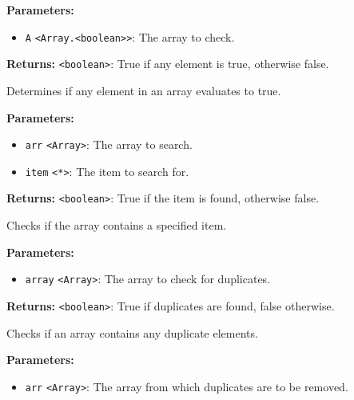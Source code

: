 \documentclass[12pt,a4paper]{article}
\begin{document}
\noindent \textbf{Parameters:}
\begin{itemize}
  \item \texttt{A} \texttt{<Array.<boolean>>}: The array to check.
\end{itemize}

\noindent \textbf{Returns:} \texttt{<boolean>}: True if any element is true, otherwise false.

\noindent Determines if any element in an array evaluates to true.

\vspace{5mm}
\noindent {}


\noindent \textbf{Parameters:}
\begin{itemize}
  \item \texttt{arr} \texttt{<Array>}: The array to search.
  \item \texttt{item} \texttt{<*>}: The item to search for.
\end{itemize}

\noindent \textbf{Returns:} \texttt{<boolean>}: True if the item is found, otherwise false.

\noindent Checks if the array contains a specified item.

\vspace{5mm}
\noindent {}


\noindent \textbf{Parameters:}
\begin{itemize}
  \item \texttt{array} \texttt{<Array>}: The array to check for duplicates.
\end{itemize}

\noindent \textbf{Returns:} \texttt{<boolean>}: True if duplicates are found, false otherwise.

\noindent Checks if an array contains any duplicate elements.

\vspace{5mm}
\noindent {}


\noindent \textbf{Parameters:}
\begin{itemize}
  \item \texttt{arr} \texttt{<Array>}: The array from which duplicates are to be removed.
\end{itemize}
\end{document}

